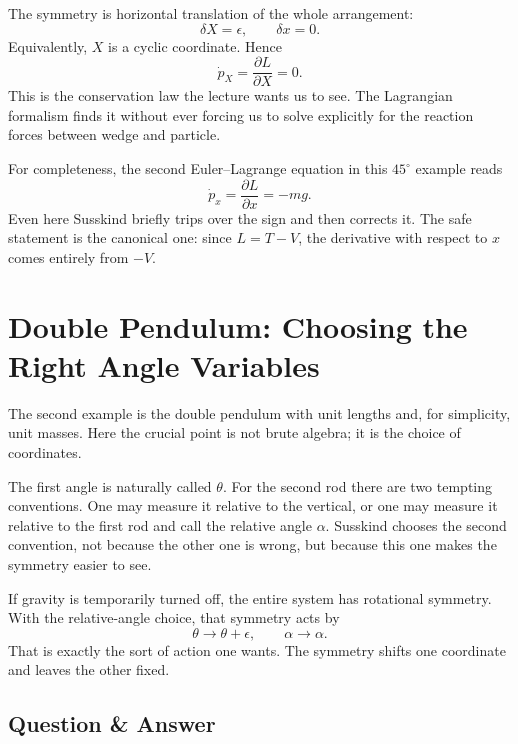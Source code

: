 The symmetry is horizontal translation of the whole arrangement:
\begin{equation}
\delta X=\epsilon,\qquad \delta x=0.
\end{equation}
Equivalently, \(X\) is a cyclic coordinate. Hence
\begin{equation}
\dot p_X=\frac{\partial L}{\partial X}=0.
\end{equation}
This is the conservation law the lecture wants us to see. The Lagrangian formalism finds it without ever forcing us to solve explicitly for the reaction forces between wedge and particle.

For completeness, the second Euler--Lagrange equation in this \(45^\circ\) example reads
\begin{equation}
\dot p_x=\frac{\partial L}{\partial x}=-mg.
\end{equation}
Even here Susskind briefly trips over the sign and then corrects it. The safe statement is the canonical one: since \(L=T-V\), the derivative with respect to \(x\) comes entirely from \(-V\).

\section{Double Pendulum: Choosing the Right Angle Variables}

The second example is the double pendulum with unit lengths and, for simplicity, unit masses. Here the crucial point is not brute algebra; it is the choice of coordinates.

The first angle is naturally called \(\theta\). For the second rod there are two tempting conventions. One may measure it relative to the vertical, or one may measure it relative to the first rod and call the relative angle \(\alpha\). Susskind chooses the second convention, not because the other one is wrong, but because this one makes the symmetry easier to see.

If gravity is temporarily turned off, the entire system has rotational symmetry. With the relative-angle choice, that symmetry acts by
\begin{equation}
\theta\to \theta+\epsilon,\qquad \alpha\to \alpha.
\end{equation}
That is exactly the sort of action one wants. The symmetry shifts one coordinate and leaves the other fixed.

\subsection{Question \& Answer}

